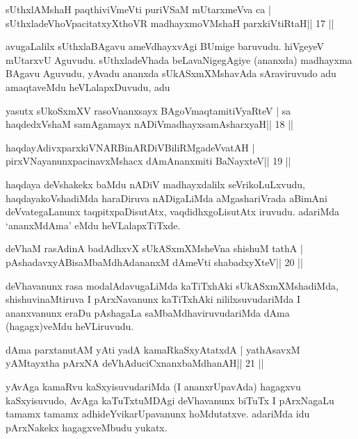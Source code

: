 \begin{shl}
sUthxlAMshaH paqthiviVmeVti puriVSaM mUtarxmeVva ca |
sUthxladeVhoVpacitatxyXthoVR madhayxmoVM\s shaH parxkiVtiRtaH\hfill || 17 ||
\end{shl}

\begin{artha}
avugaLalilx sUthxlaBAgavu ameVdhayxvAgi BUmige baruvudu. hiVgeyeV mUtarxvU
Aguvudu. sUthxladeVhada beLavaNigegAgiye (ananxda) madhayxma BAgavu
Aguvudu, yAvadu ananxda sUkASxmXMshavAda sAraviruvudo adu amaqtaveMdu
heVLalapxDuvudu, adu 
\end{artha}

\begin{shl}
yasutx sUkoSxmXV rasoV\s nanxsayx BAgoV\s maqtamitiVyaRteV |
sa haqdedxVshaM samAgamayx nADiVmadhayxsamAsharxyaH\hfill || 18 ||
\end{shl}

\begin{shl}
haqdayAdivxparxkiVNARBinARDiVBiliRMgadeVvatAH |
pirxVNayanunxpacinavxMshacx dAmAnanxmiti BaNayxteV\hfill || 19 ||
\end{shl}

\begin{artha}
haqdaya deVshakekx baMdu nADiV madhayxdalilx seVrikoLuLxvudu, haqdayakoVshadiMda haraDiruva nADigaLiMda aMgashariVrada aBimAni deVvategaLanunx taqpitxpaDisutAtx, vaqdidhxgoLisutAtx iruvudu. adariMda `ananxMdAma' eMdu heVLalapxTiTxde.
\end{artha}

\begin{shl}
deVhaM rasAdinA badAdhxvX sUkASxmXMsheVna shishuM tathA |
pAshadavxyABisaMbaMdhAdananxM dAmeVti shabadxyXteV\hfill || 20 ||
\end{shl}

\begin{artha}
deVhavanunx rasa modalAdavugaLiMda kaTiTxhAki sUkASxmXMshadiMda, shishuvinaMtiruva I pArxNavanunx kaTiTxhAki nililxsuvudariMda I ananxvanunx eraDu pAshagaLa saMbaMdhaviruvudariMda dAma (hagagx)veMdu heVLiruvudu.
\end{artha}

\begin{shl}
dAma parxtanutAM yAti yadA kamaRkaSxyAtatxdA |
yathAsavxM yAMtayxtha pArxNA deVhAduciCxnanxbaMdhanAH\hfill || 21 ||
\end{shl}

\begin{artha}
yAvAga kamaRvu kaSxyisuvudariMda (I ananxrUpavAda) hagagxvu kaSxyisuvudo, AvAga kaTuTxtuMDAgi deVhavanunx biTuTx I pArxNagaLu tamamx tamamx adhideYvikarUpavanunx hoMdutatxve. adariMda idu pArxNakekx hagagxveMbudu yukatx.
\end{artha}

